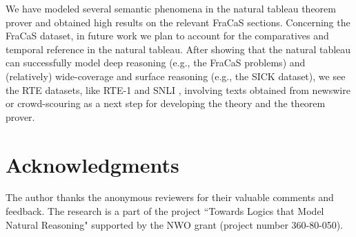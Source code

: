\documentclass[11pt]{article}
\newcommand{\sick}{SICK}
\begin{document}
We have modeled several semantic phenomena in the natural tableau theorem prover and obtained high results on the relevant FraCaS sections.
Concerning the FraCaS dataset, in future work we plan to account for the comparatives and temporal reference in the natural tableau.
After showing that the natural tableau can successfully model deep reasoning (e.g., the FraCaS problems) and (relatively) wide-coverage and surface reasoning (e.g., the \sick{} dataset), we see the RTE datasets, like RTE-1 \cite{Dagan:2005} and SNLI \cite{bowman-EtAl:2015:EMNLP}, involving texts obtained from newswire or crowd-scouring as a next step for developing the theory and the theorem prover.        
 




\section*{Acknowledgments}

The author thanks the anonymous reviewers for their valuable comments and feedback.
The research is a part of the project ``Towards Logics that Model Natural Reasoning" supported by the NWO grant (project number 360-80-050).
 



%

\end{document}
